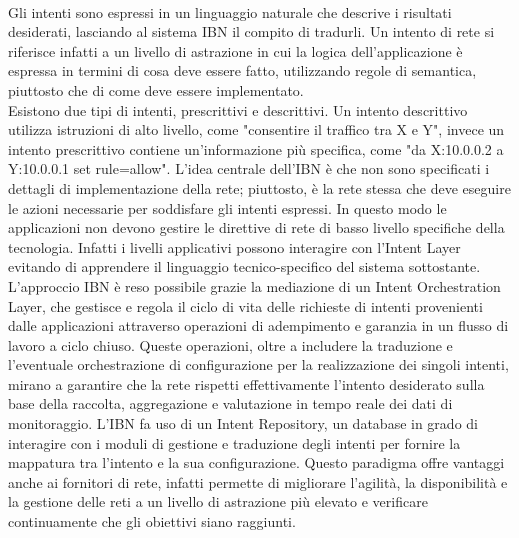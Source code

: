 \\Gli intenti sono espressi in un linguaggio naturale che descrive i risultati desiderati, lasciando al sistema IBN il compito di tradurli.
Un intento di rete si riferisce infatti a un livello di astrazione in cui la logica dell'applicazione è espressa in termini di cosa deve essere fatto, utilizzando regole di semantica, piuttosto che di come deve essere implementato.
\\Esistono due tipi di intenti, prescrittivi e descrittivi.
Un intento descrittivo utilizza istruzioni di alto livello, come "consentire il traffico tra X e Y", invece un intento prescrittivo contiene un'informazione 
più specifica, come "da X:10.0.0.2 a Y:10.0.0.1 set rule=allow"\cite{ibn2}.
L'idea centrale dell'IBN è che non sono specificati i dettagli di implementazione della rete; piuttosto, è la rete stessa che deve eseguire le azioni necessarie per soddisfare gli intenti espressi.
In questo modo le applicazioni non devono gestire le direttive di rete di basso livello specifiche della tecnologia. Infatti i livelli applicativi possono interagire con l'Intent Layer evitando di apprendere il linguaggio tecnico-specifico del sistema sottostante.
L'approccio IBN è reso possibile grazie la mediazione di un Intent Orchestration Layer, che gestisce e regola il ciclo di vita delle richieste di intenti provenienti dalle applicazioni attraverso operazioni 
di adempimento e garanzia in un flusso di lavoro a ciclo chiuso.
Queste operazioni, oltre a includere la traduzione e l'eventuale orchestrazione di configurazione per la realizzazione dei singoli intenti, mirano a garantire che la rete rispetti effettivamente l'intento desiderato 
sulla base della raccolta, aggregazione e valutazione in tempo reale dei dati di monitoraggio.
L'IBN fa uso di un Intent Repository, un database in grado di interagire con i moduli di gestione e traduzione 
degli intenti per fornire la mappatura tra l'intento e la sua configurazione.
Questo paradigma offre vantaggi anche ai fornitori di rete, infatti permette di migliorare l'agilità, la disponibilità
e la gestione delle reti a un livello di astrazione più elevato e verificare continuamente che gli obiettivi siano raggiunti. 


